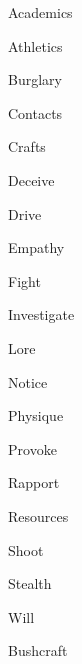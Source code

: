 \begin{npcBox}[title=Indiana a Lost looter]

    \begin{aspects}
    \item {}
    \item {}
    \item {}
    \end{aspects}
    
    \begin{skills}
        \item {} Academics
        \item {} Athletics
        \item {} Burglary
        \item {} Contacts
        \item {} Crafts
        \item {} Deceive
        \item {} Drive
        \item {} Empathy
        \item {} Fight
        \item {} Investigate
        \item {} Lore
        \item {} Notice
        \item {} Physique
        \item {} Provoke
        \item {} Rapport
        \item {} Resources
        \item {} Shoot
        \item {} Stealth
        \item {} Will
        \item {} Bushcraft
     \end{skills}
    
    \begin{stunts}
    \item {}
    \end{stunts}
    
    \begin{stressSection}
    \end{stressSection}
    \begin{tabularx}{\textwidth}{ XX }
    \end{tabularx}
    

\end{npcBox}
